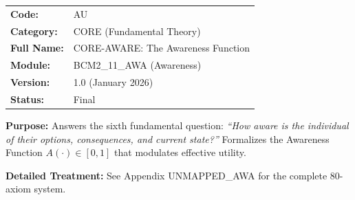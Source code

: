 %
%
%
%

\begin{tcolorbox}[colback=gray!5!white, colframe=gray!75!black,
    title=Appendix Header: AU CORE-AWARE]

\begin{tabular}{@{}ll@{}}
\textbf{Code:} & AU \\
\textbf{Category:} & CORE (Fundamental Theory) \\
\textbf{Full Name:} & CORE-AWARE: The Awareness Function \\
\textbf{Module:} & BCM2\_11\_AWA (Awareness) \\
\textbf{Version:} & 1.0 (January 2026) \\
\textbf{Status:} & Final \\
\end{tabular}

\vspace{0.5em}
\textbf{Purpose:} Answers the sixth fundamental question:
\textit{``How aware is the individual of their options, consequences, and current state?''}
Formalizes the Awareness Function $A(\cdot) \in [0, 1]$ that modulates effective utility.

\textbf{Detailed Treatment:} See Appendix UNMAPPED_AWA for the complete 80-axiom system.

\end{tcolorbox}

